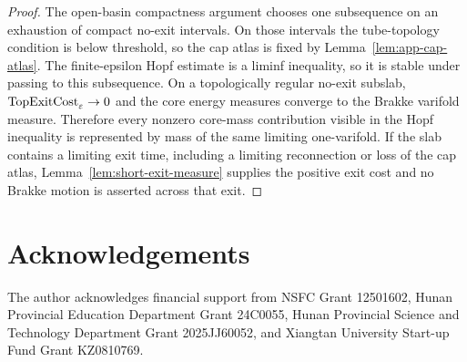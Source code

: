 \documentclass[11pt]{article}
\theoremstyle{definition}
\newcommand{\eps}{\varepsilon}
\begin{document}
\begin{proof}
The open-basin compactness argument chooses one subsequence on an exhaustion of
compact no-exit intervals.  On those intervals the tube-topology condition is
below threshold, so the cap atlas is fixed by Lemma~\ref{lem:app-cap-atlas}.
The finite-epsilon Hopf estimate is a liminf inequality, so it is stable under
passing to this subsequence.  On a topologically regular no-exit subslab,
\({\rm TopExitCost}_\eps\to0\) and the core energy measures converge to the
Brakke varifold measure.  Therefore every nonzero core-mass contribution visible
in the Hopf inequality is represented by mass of the same limiting
one-varifold.  If the slab contains a limiting exit time, including a limiting
reconnection or loss of the cap atlas, Lemma~\ref{lem:short-exit-measure}
supplies the positive exit cost and no Brakke motion is asserted across that
exit.
\end{proof}

\section*{Acknowledgements}

The author acknowledges financial support from NSFC Grant 12501602, Hunan
Provincial Education Department Grant 24C0055, Hunan Provincial Science and
Technology Department Grant 2025JJ60052, and Xiangtan University Start-up Fund
Grant KZ0810769.
\end{document}

